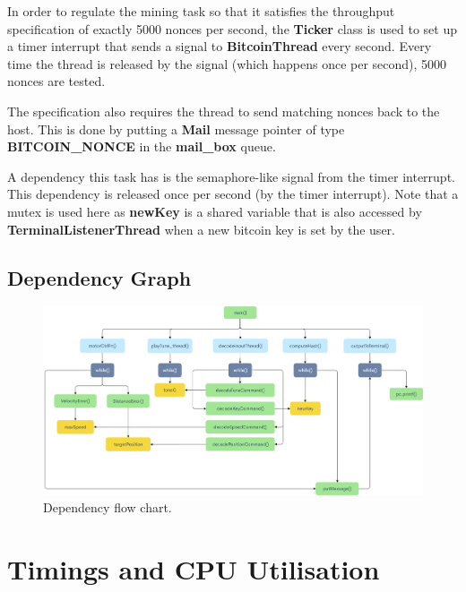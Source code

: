 \documentclass{article}
\begin{document}
\bigskip

\noindent
In order to regulate the mining task so that it satisfies the throughput specification of exactly 5000 nonces per second, the \textbf{Ticker} class is used to set up a timer interrupt that sends a signal to \textbf{BitcoinThread} every second. Every time the thread is released by the signal (which happens once per second), 5000 nonces are tested.

\bigskip

\noindent
The specification also requires the thread to send matching nonces back to the host. This is done by putting a \textbf{Mail} message pointer of type \textbf{BITCOIN\_NONCE} in the \textbf{mail\_box} queue.

\bigskip



\bigskip

\noindent
A dependency this task has is the semaphore-like signal from the timer interrupt. This dependency is released once per second (by the timer interrupt). Note that a mutex is used here as \textbf{newKey} is a shared variable that is also accessed by \textbf{TerminalListenerThread} when a new bitcoin key is set by the user.


\subsection{Dependency Graph}

\begin{figure}[H]
\begin{center}
   \includegraphics[width=0.9\linewidth]{dependency.png}
\end{center}
   \caption{Dependency flow chart.}
\label{fig:long}
\label{fig:onecol}
\end{figure}

\section{Timings and CPU Utilisation}
\end{document}
